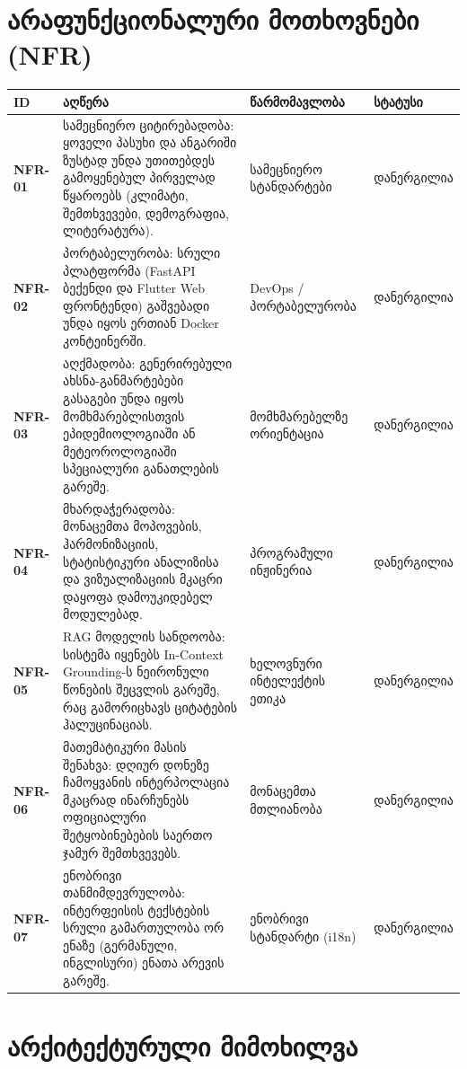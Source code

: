\documentclass[11pt,a4paper]{article}
\begin{document}
\section{არაფუნქციონალური მოთხოვნები (NFR)}

\begin{longtable}{@{}>{\bfseries}p{1.6cm} L{7.4cm} L{3.6cm} L{2.4cm}@{}}
\toprule
ID & აღწერა & წარმომავლობა & სტატუსი \\
\midrule
\endhead
NFR-01 & სამეცნიერო ციტირებადობა: ყოველი პასუხი და ანგარიში ზუსტად უნდა უთითებდეს გამოყენებულ პირველად წყაროებს (კლიმატი, შემთხვევები, დემოგრაფია, ლიტერატურა). & სამეცნიერო სტანდარტები & დანერგილია \\
NFR-02 & პორტაბელურობა: სრული პლატფორმა (FastAPI ბექენდი და Flutter Web ფრონტენდი) გაშვებადი უნდა იყოს ერთიან Docker კონტეინერში. & DevOps / პორტაბელურობა & დანერგილია \\
NFR-03 & აღქმადობა: გენერირებული ახსნა-განმარტებები გასაგები უნდა იყოს მომხმარებლისთვის ეპიდემიოლოგიაში ან მეტეოროლოგიაში სპეციალური განათლების გარეშე. & მომხმარებელზე ორიენტაცია & დანერგილია \\
NFR-04 & მხარდაჭერადობა: მონაცემთა მოპოვების, ჰარმონიზაციის, სტატისტიკური ანალიზისა და ვიზუალიზაციის მკაცრი დაყოფა დამოუკიდებელ მოდულებად. & პროგრამული ინჟინერია & დანერგილია \\
NFR-05 & RAG მოდელის სანდოობა: სისტემა იყენებს In-Context Grounding-ს ნეირონული წონების შეცვლის გარეშე, რაც გამორიცხავს ციტატების ჰალუცინაციას. & ხელოვნური ინტელექტის ეთიკა & დანერგილია \\
NFR-06 & მათემატიკური მასის შენახვა: დღიურ დონეზე ჩამოყვანის ინტერპოლაცია მკაცრად ინარჩუნებს ოფიციალური შეტყობინებების საერთო ჯამურ შემთხვევებს. & მონაცემთა მთლიანობა & დანერგილია \\
NFR-07 & ენობრივი თანმიმდევრულობა: ინტერფეისის ტექსტების სრული გამართულობა ორ ენაზე (გერმანული, ინგლისური) ენათა არევის გარეშე. & ენობრივი სტანდარტი (i18n) & დანერგილია \\
\bottomrule
\end{longtable}

\section{არქიტექტურული მიმოხილვა}
\end{document}
